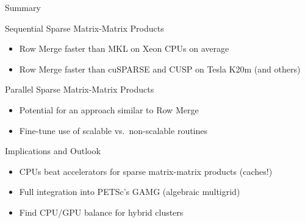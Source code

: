 \begin{frame}{Summary}

 \begin{block}{Sequential Sparse Matrix-Matrix Products}
   \begin{itemize}
    \item Row Merge faster than MKL on Xeon CPUs on average
    \item Row Merge faster than cuSPARSE and CUSP on Tesla K20m (and others)
   \end{itemize}
 \end{block}

 \pause
  \begin{block}{Parallel Sparse Matrix-Matrix Products}
   \begin{itemize}
    \item Potential for an approach similar to Row Merge
    \item Fine-tune use of scalable vs.~non-scalable routines
   \end{itemize}
 \end{block}

 \pause
 \begin{block}{Implications and Outlook}
   \begin{itemize}
    \item CPUs beat accelerators for sparse matrix-matrix products (caches!)
    \item Full integration into PETSc's GAMG (algebraic multigrid)
    \item Find CPU/GPU balance for hybrid clusters
   \end{itemize}
 \end{block}

\end{frame}

